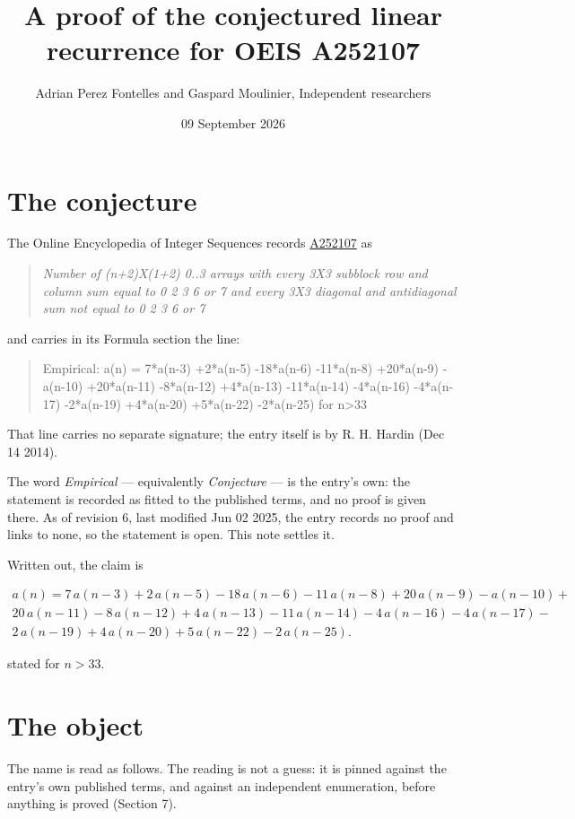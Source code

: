 \documentclass[11pt]{article}
\title{A proof of the conjectured linear recurrence for OEIS A252107}
\author{Adrian Perez Fontelles and Gaspard Moulinier, Independent researchers}
\date{09 September 2026}
\theoremstyle{definition}
\begin{document}
\maketitle
\section{The conjecture}

The Online Encyclopedia of Integer Sequences records \href{https://oeis.org/A252107}{A252107} as

\begin{quote}\itshape Number of (n+2)X(1+2) 0..3 arrays with every 3X3 subblock row and column sum equal to 0 2 3 6 or 7 and every 3X3 diagonal and antidiagonal sum not equal to 0 2 3 6 or 7\end{quote}

and carries in its Formula section the line:

\begin{quote}\ttfamily Empirical: a(n) = 7*a(n-3) +2*a(n-5) -18*a(n-6) -11*a(n-8) +20*a(n-9) -a(n-10) +20*a(n-11) -8*a(n-12) +4*a(n-13) -11*a(n-14) -4*a(n-16) -4*a(n-17) -2*a(n-19) +4*a(n-20) +5*a(n-22) -2*a(n-25) for n>33\end{quote}

That line carries no separate signature; the entry itself is by R. H. Hardin (Dec 14 2014).

The word {\itshape Empirical} --- equivalently {\itshape Conjecture} --- is the entry's own: the statement is recorded as fitted to the published terms, and no proof is given there. As of revision 6, last modified Jun 02 2025, the entry records no proof and links to none, so the statement is open. This note settles it.

Written out, the claim is

\begin{multline*} a(n) = 7\,a(n-3) + 2\,a(n-5) - 18\,a(n-6) - 11\,a(n-8) + 20\,a(n-9) - a(n-10) + \\ 20\,a(n-11) - 8\,a(n-12) + 4\,a(n-13) - 11\,a(n-14) - 4\,a(n-16) - 4\,a(n-17) - \\ 2\,a(n-19) + 4\,a(n-20) + 5\,a(n-22) - 2\,a(n-25). \end{multline*}

stated for $n > 33$.

\section{The object}

The name is read as follows. The reading is not a guess: it is pinned against the entry's own published terms, and against an independent enumeration, before anything is proved (Section 7).
\end{document}
